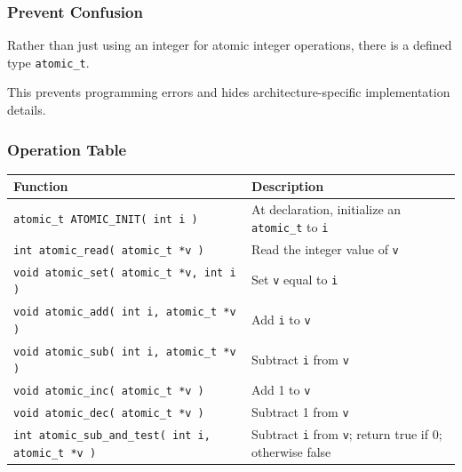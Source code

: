 \begin{frame}
	\frametitle{Prevent Confusion}

	Rather than just using an integer for atomic integer operations, there is a defined type \texttt{atomic\_t}.

	This prevents programming errors and hides architecture-specific implementation details.

\end{frame}


\begin{frame}
	\frametitle{Operation Table}

	{\scriptsize
		\begin{center}
			\begin{tabular}{l|l}
				\textbf{Function}                                          & \textbf{Description}                                                   \\\hline

				\texttt{atomic\_t ATOMIC\_INIT( int i )}                   & At declaration, initialize an \texttt{atomic\_t} to \texttt{i}         \\\hline

				\texttt{int atomic\_read( atomic\_t *v )}                  & Read the integer value of \texttt{v}                                   \\\hline

				\texttt{void atomic\_set( atomic\_t *v, int i )}           & Set \texttt{v} equal to \texttt{i}                                     \\\hline

				\texttt{void atomic\_add( int i, atomic\_t *v )}           & Add \texttt{i} to \texttt{v}                                           \\\hline

				\texttt{void atomic\_sub( int i, atomic\_t *v )}           & Subtract \texttt{i} from \texttt{v}                                    \\\hline

				\texttt{void atomic\_inc( atomic\_t *v )}                  & Add 1 to \texttt{v}                                                    \\\hline

				\texttt{void atomic\_dec( atomic\_t *v )}                  & Subtract 1 from \texttt{v}                                             \\\hline

				\texttt{int atomic\_sub\_and\_test( int i, atomic\_t *v )} & Subtract \texttt{i} from \texttt{v}; return true if 0; otherwise false \\\hline


\end{tabular}
\end{center}}
\end{frame}
